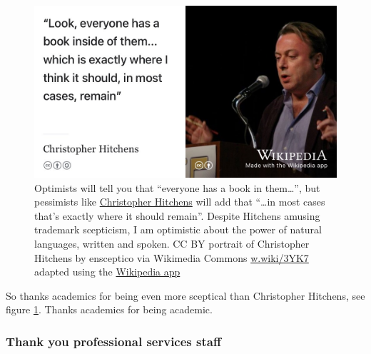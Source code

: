 \documentclass[
]{book}
\begin{document}
\begin{figure}

{\centering \includegraphics[width=0.99\linewidth]{images/everyone-has-a-book-inside-them} 

}

\caption{Optimists will tell you that ``everyone has a book in them\ldots{}'', but pessimists like \href{https://en.wikipedia.org/wiki/Christopher_Hitchens}{Christopher Hitchens} will add that ``\ldots in most cases that's exactly where it should remain''. \citep{everyone} Despite Hitchens amusing trademark scepticism, I am optimistic about the power of natural languages, written and spoken. CC BY portrait of Christopher Hitchens by ensceptico via Wikimedia Commons \href{https://w.wiki/3YK7}{w.wiki/3YK7} adapted using the \href{https://apps.apple.com/us/app/wikipedia/id324715238}{Wikipedia app}}\label{fig:hitchens-fig}
\end{figure}



So thanks academics for being even more sceptical than Christopher Hitchens, see figure \ref{fig:hitchens-fig}. Thanks academics for being academic. 🙏

\hypertarget{psstaff}{%
\subsubsection{Thank you professional services staff}\label{psstaff}}
\end{document}

